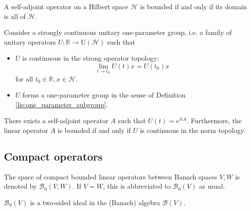     \begin{theorem}
        A self-adjoint operator on a Hilbert space $\mathcal{H}$ is bounded if and only if its domain is all of $\mathcal{H}$.
    \end{theorem}

    \begin{theorem}[Stone]\label{functional:stone}
        Consider a strongly continuous unitary one-parameter group, i.e. a family of unitary operators $U:\mathbb{R}\rightarrow\mathrm{U}(\mathcal{H})$ such that
        \begin{itemize}
            \item $U$ is continuous in the strong operator topology: \[\lim_{t\rightarrow t_0}U(t)x=U(t_0)x\] for all $t_0\in\mathbb{R}, x\in\mathcal{H}$.
            \item $U$ forms a one-parameter group in the sense of Definition \ref{lie:one_parameter_subgroup}.
        \end{itemize}
        There exists a self-adjoint operator $A$ such that $U(t)=e^{itA}$. Furthermore, the linear operator $A$ is bounded if and only if $U$ is continuous in the norm topology.
    \end{theorem}

\subsection{Compact operators}



    \begin{notation}
        The space of compact bounded linear operators between Banach spaces $V,W$ is denoted by $\mathcal{B}_0(V,W)$. If $V=W$, this is abbreviated to $\mathcal{B}_0(V)$ as usual.
    \end{notation}
    \begin{property}
        $\mathcal{B}_0(V)$ is a two-sided ideal in the (Banach) algebra $\mathcal{B}(V)$.
    \end{property}

